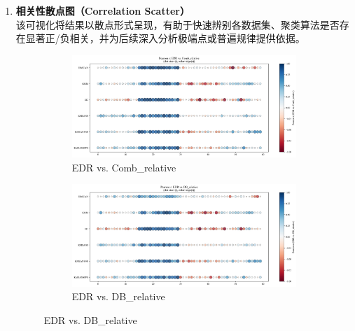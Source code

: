 \documentclass[10pt]{article} %
\numberwithin{equation}{section}
\begin{document}
\begin{enumerate}[label=(\alph*)]
    \item \textbf{相关性散点图（Correlation Scatter）} \\
    该可视化将结果以散点形式呈现，有助于快速辨别各数据集、聚类算法是否存在显著正/负相关，并为后续深入分析极端点或普遍规律提供依据。
\begin{figure}[htbp]
    \centering
    
    \begin{subfigure}[b]{0.45\linewidth}
        \centering
        \includegraphics[width=\linewidth]{figures/point graph/dot_EDR_vs_Comb_relative_sorted.pdf}
        \caption{EDR vs. Comb\_relative}
        \label{fig:dot_edr_comb}
    \end{subfigure}
    \hfill
    \begin{subfigure}[b]{0.45\linewidth}
        \centering
        \includegraphics[width=\linewidth]{figures/point graph/dot_EDR_vs_DB_relative_sorted.pdf}
        \caption{EDR vs. DB\_relative}
        \label{fig:dot_edr_db}
    \end{subfigure}

    \vspace{1em} %


\end{figure}
\end{enumerate}
\end{document}
